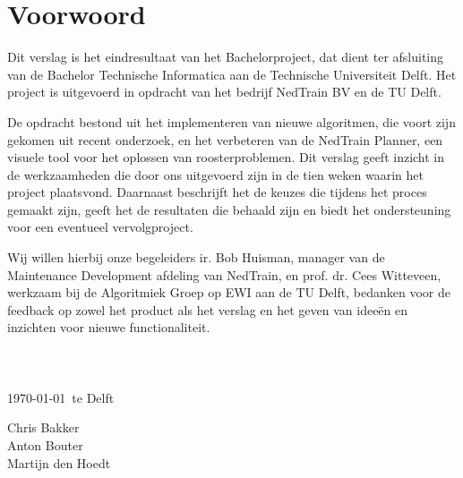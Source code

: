 \section*{Voorwoord}
Dit verslag is het eindresultaat van het Bachelorproject, dat dient ter afsluiting van de Bachelor Technische Informatica aan de Technische Universiteit Delft. Het project is uitgevoerd in opdracht van het bedrijf NedTrain BV en de TU Delft.

De opdracht bestond uit het implementeren van nieuwe algoritmen, die voort zijn gekomen uit recent onderzoek, en het verbeteren van de NedTrain Planner, een visuele tool voor het oplossen van roosterproblemen. Dit verslag geeft inzicht in de werkzaamheden die door ons uitgevoerd zijn in de tien weken waarin het project plaatsvond. Daarnaast beschrijft het de keuzes die tijdens het proces gemaakt zijn, geeft het de resultaten die behaald zijn en biedt het ondersteuning voor een eventueel vervolgproject.

Wij willen hierbij onze begeleiders ir. Bob Huisman, manager van de Maintenance Development afdeling van NedTrain, en prof. dr. Cees Witteveen, werkzaam bij de Algoritmiek Groep op EWI aan de TU Delft, bedanken voor de feedback op zowel het product als het verslag en het geven van idee\"en en inzichten voor nieuwe functionaliteit. 
\\ \\ \\ \\
\today ~te Delft

Chris Bakker \\
Anton Bouter \\
Martijn den Hoedt
